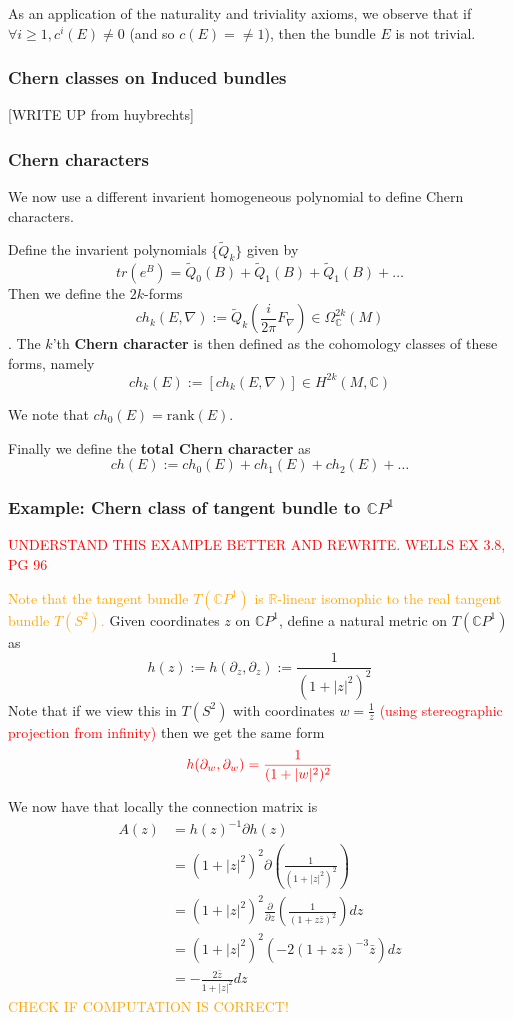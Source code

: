 \documentclass[a4paper]{article}
\theoremstyle{definition} \newtheorem*{definition}{Definition}
\theoremstyle{definition} \newtheorem*{definitions}{Definitions}
\theoremstyle{plain} \newtheorem{theorem}{Theorem}[section]
\theoremstyle{plain} \newtheorem{proposition}[theorem]{Proposition}
\theoremstyle{plain} \newtheorem{corollary}[theorem]{Corollary}
\theoremstyle{plain} \newtheorem{lemma}[theorem]{Lemma}
\theoremstyle{plain} \newtheorem{example}[theorem]{Example}
\newcommand{\checkCorrect}[1]{\textcolor{red}{#1}}
\newcommand{\understandBetter}[1]{\textcolor{orange}{#1}}
\newcommand{\defn}[1]{\textbf{#1}}
\newcommand{\realnos}{\mathbb{R}}
\newcommand{\complexnos}{\mathbb{C}}
\begin{document}
As an application of the naturality and triviality axioms, we observe that if $\forall i\geq 1, c^i(E)\neq 0$ (and so $c(E)=\neq 1$), then the bundle $E$ is not trivial. 

\subsubsection{Chern classes on Induced bundles}
[WRITE UP from huybrechts]

\subsubsection{Chern characters}
We now use a different invarient homogeneous polynomial to define Chern characters. 

Define the invarient polynomials $\{\tilde{Q}_k\}$ given by 
$$tr(e^B)=\tilde{Q}_0(B)+\tilde{Q}_1(B)+\tilde{Q}_1(B)+\ldots $$
Then we define the $2k$-forms 
$$ch_k(E,\nabla):=\tilde{Q}_k \left( \frac{i}{2\pi}F_\nabla \right) \in \Omega^{2k}_\complexnos (M)$$.
The $k$'th \defn{Chern character} is then defined as the cohomology classes of these forms, namely
$$ch_k(E):= [ch_k(E, \nabla)]\in H^{2k}(M, \complexnos)$$

We note that $ch_0(E)=\text{rank}(E)$.

Finally we define the \defn{total Chern character} as 
$$ch(E):=ch_0(E)+ch_1(E)+ch_2(E)+\ldots$$

\subsubsection{Example: Chern class of tangent bundle to $\complexnos P^1$}
\checkCorrect{UNDERSTAND THIS EXAMPLE BETTER AND REWRITE. WELLS EX 3.8, PG 96}

\understandBetter{Note that the tangent bundle $T(\complexnos P^1)$ is $\realnos$-linear isomophic to the real tangent bundle $T(S^2)$.} Given coordinates $z$ on $\complexnos P^1$, define a natural metric on $T(\complexnos P^1)$ as
$$h(z):= h(\partial_z, \partial_z) := \frac{1}{(1+|z|^2)^2}$$
Note that if we view this in $T(S^2)$ with coordinates $w=\frac{1}{z}$ \checkCorrect{(using stereographic projection from infinity)} then we get the same form 
$$\checkCorrect{h(\partial_w, \partial_w)=\frac{1}{(1+|w|^2)^2}}$$

We now have that locally the connection matrix is
\begin{align*}
A(z) & =h(z)^{-1}\partial h(z) \\
& = (1+|z|^2)^2 \partial \left( \frac{1}{(1+|z|^2)^2} \right) \\
& = (1+|z|^2)^2 \frac{\partial}{\partial z} \left( \frac{1}{(1+z\bar{z})^2} \right)dz \\
& = (1+|z|^2)^2 \left( -2 (1+z\bar{z})^{-3} \bar{z} \right)dz \\
& = -\frac{2\bar{z}}{1+|z|^2} dz
\end{align*}
\understandBetter{CHECK IF COMPUTATION IS CORRECT!}
\end{document}
